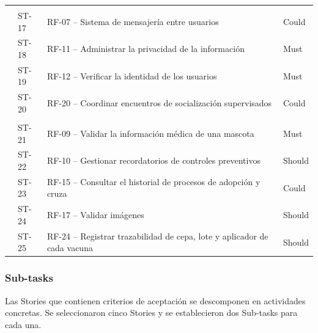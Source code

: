 \documentclass[journal,onecolumn]{IEEEtran}
\begin{document}
\begin{longtable}{L{1.5cm} L{1.5cm} L{7.6cm} L{1.6cm}}
		\addlinespace
		 \\
		& ST-17 & RF-07 -- Sistema de mensajería entre usuarios & Could \\
		& ST-18 & RF-11 -- Administrar la privacidad de la información & Must \\
		& ST-19 & RF-12 -- Verificar la identidad de los usuarios & Must \\
		& ST-20 & RF-20 -- Coordinar encuentros de socialización supervisados & Could \\
		\addlinespace
		 \\
		& ST-21 & RF-09 -- Validar la información médica de una mascota & Must \\
		& ST-22 & RF-10 -- Gestionar recordatorios de controles preventivos & Should \\
		& ST-23 & RF-15 -- Consultar el historial de procesos de adopción y cruza & Could \\
		& ST-24 & RF-17 -- Validar imágenes & Should \\
		& ST-25 & RF-24 -- Registrar trazabilidad de cepa, lote y aplicador de cada vacuna &
		Should \\
	\end{longtable}
	
	\subsubsection{Sub-tasks}
	
	Las Stories que contienen criterios de aceptación se descomponen en actividades concretas. Se
	seleccionaron cinco Stories y se establecieron dos Sub-tasks para cada una.
	
\end{document}
